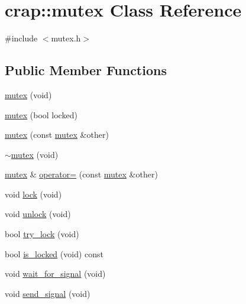\hypertarget{classcrap_1_1mutex}{\section{crap\-:\-:mutex Class Reference}
\label{classcrap_1_1mutex}
}


{\ttfamily \#include $<$mutex.\-h$>$}

\subsection*{Public Member Functions}
\begin{DoxyCompactItemize}
\item 
\hyperlink{classcrap_1_1mutex_a1e6f15c4fc1301909402411e66ca34dc}{mutex} (void)
\item 
\hyperlink{classcrap_1_1mutex_a2ad848dcd8a8eef37264894cb09fa964}{mutex} (bool locked)
\item 
\hyperlink{classcrap_1_1mutex_a30cb3c25bc6c77f1583b632c78165866}{mutex} (const \hyperlink{classcrap_1_1mutex}{mutex} \&other)
\item 
\hyperlink{classcrap_1_1mutex_a66d7a6db24c955c174b757c091758211}{$\sim$mutex} (void)
\item 
\hyperlink{classcrap_1_1mutex}{mutex} \& \hyperlink{classcrap_1_1mutex_ac06aa8707cc11ab646fda1765e920187}{operator=} (const \hyperlink{classcrap_1_1mutex}{mutex} \&other)
\item 
void \hyperlink{classcrap_1_1mutex_a8f0c9a823e7880e18e62fb3f61208ee9}{lock} (void)
\item 
void \hyperlink{classcrap_1_1mutex_a0cefb987db301f72e11409bc66c71d2d}{unlock} (void)
\item 
bool \hyperlink{classcrap_1_1mutex_a340575dc83f8ff1323b1b4a6840b94c4}{try\-\_\-lock} (void)
\item 
bool \hyperlink{classcrap_1_1mutex_ab74364abe1722d8014455b64c86229f5}{is\-\_\-locked} (void) const 
\item 
void \hyperlink{classcrap_1_1mutex_a14470e12dc068440d1404c38d4bc7fdc}{wait\-\_\-for\-\_\-signal} (void)
\item 
void \hyperlink{classcrap_1_1mutex_af1fc6b8793506c3cdb51123c3dd404f4}{send\-\_\-signal} (void)
\end{DoxyCompactItemize}


